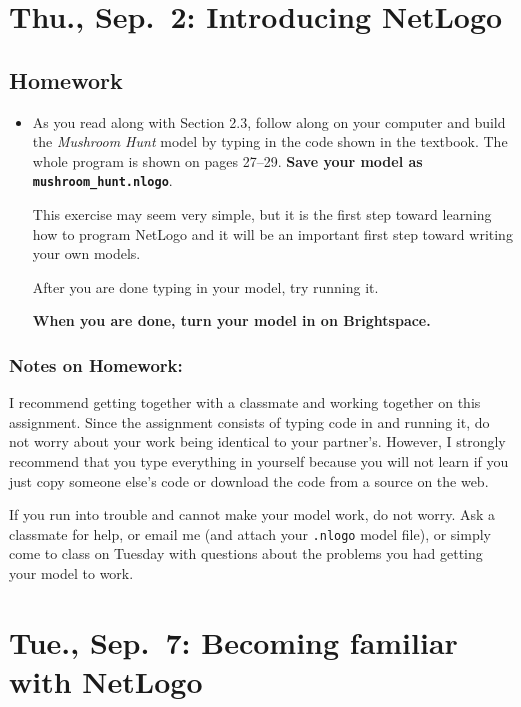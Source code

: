 \documentclass[
]{article}
\begin{document}
\hypertarget{thu.-sep.-2-introducing-netlogo}{%
\section{Thu., Sep.~2: Introducing
NetLogo}\label{thu.-sep.-2-introducing-netlogo}}

\hypertarget{homework-1}{%
\subsection{Homework}\label{homework-1}}

\begin{itemize}
\item
  As you read along with Section 2.3, follow along on your computer and
  build the \emph{Mushroom Hunt} model by typing in the code shown in
  the textbook. The whole program is shown on pages 27--29. \textbf{Save
  your model as \texttt{mushroom\_hunt.nlogo}}.

  This exercise may seem very simple, but it is the first step toward
  learning how to program NetLogo and it will be an important first step
  toward writing your own models.

  After you are done typing in your model, try running it.

  \textbf{When you are done, turn your model in on Brightspace.}
\end{itemize}

\hypertarget{notes-on-homework}{%
\subsubsection{Notes on Homework:}\label{notes-on-homework}}

I recommend getting together with a classmate and working together on
this assignment. Since the assignment consists of typing code in and
running it, do not worry about your work being identical to your
partner's. However, I strongly recommend that you type everything in
yourself because you will not learn if you just copy someone else's code
or download the code from a source on the web.

If you run into trouble and cannot make your model work, do not worry.
Ask a classmate for help, or email me (and attach your \texttt{.nlogo}
model file), or simply come to class on Tuesday with questions about the
problems you had getting your model to work.

\hypertarget{tue.-sep.-7-becoming-familiar-with-netlogo}{%
\section{Tue., Sep.~7: Becoming familiar with
NetLogo}\label{tue.-sep.-7-becoming-familiar-with-netlogo}}
\end{document}
